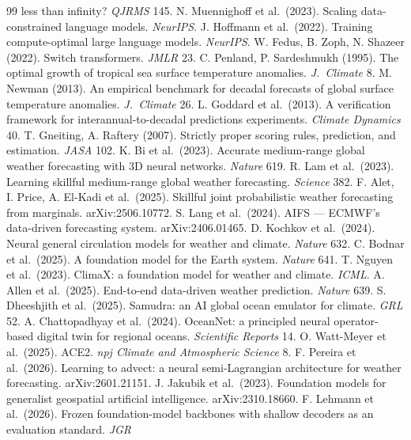 \documentclass[10pt]{article}
\begin{document}
\begin{thebibliography}{99}
less than infinity? \emph{QJRMS} 145.
 N. Muennighoff et al.\ (2023). Scaling data-constrained
language models. \emph{NeurIPS}.
 J. Hoffmann et al.\ (2022). Training compute-optimal
large language models. \emph{NeurIPS}.
 W. Fedus, B. Zoph, N. Shazeer (2022). Switch transformers.
\emph{JMLR} 23.
 C. Penland, P. Sardeshmukh (1995). The optimal growth of
tropical sea surface temperature anomalies. \emph{J.\ Climate} 8.
 M. Newman (2013). An empirical benchmark for decadal
forecasts of global surface temperature anomalies. \emph{J.\ Climate} 26.
 L. Goddard et al.\ (2013). A verification framework for
interannual-to-decadal predictions experiments. \emph{Climate Dynamics} 40.
 T. Gneiting, A. Raftery (2007). Strictly proper scoring
rules, prediction, and estimation. \emph{JASA} 102.
 K. Bi et al.\ (2023). Accurate medium-range global weather
forecasting with 3D neural networks. \emph{Nature} 619.
 R. Lam et al.\ (2023). Learning skillful medium-range
global weather forecasting. \emph{Science} 382.
 F. Alet, I. Price, A. El-Kadi et al.\ (2025). Skillful joint
probabilistic weather forecasting from marginals. arXiv:2506.10772.
 S. Lang et al.\ (2024). AIFS --- ECMWF's data-driven
forecasting system. arXiv:2406.01465.
 D. Kochkov et al.\ (2024). Neural general circulation
models for weather and climate. \emph{Nature} 632.
 C. Bodnar et al.\ (2025). A foundation model for the Earth
system. \emph{Nature} 641.
 T. Nguyen et al.\ (2023). ClimaX: a foundation model for
weather and climate. \emph{ICML}.
 A. Allen et al.\ (2025). End-to-end data-driven weather
prediction. \emph{Nature} 639.
 S. Dheeshjith et al.\ (2025). Samudra: an AI global ocean
emulator for climate. \emph{GRL} 52.
 A. Chattopadhyay et al.\ (2024). OceanNet: a principled
neural operator-based digital twin for regional oceans. \emph{Scientific
Reports} 14.
 O. Watt-Meyer et al.\ (2025). ACE2. \emph{npj Climate and
Atmospheric Science} 8.
 F. Pereira et al.\ (2026). Learning to advect: a neural
semi-Lagrangian architecture for weather forecasting. arXiv:2601.21151.
 J. Jakubik et al.\ (2023). Foundation models for
generalist geospatial artificial intelligence. arXiv:2310.18660.
 F. Lehmann et al.\ (2026). Frozen foundation-model
backbones with shallow decoders as an evaluation standard. \emph{JGR
}
\end{thebibliography}
\end{document}
